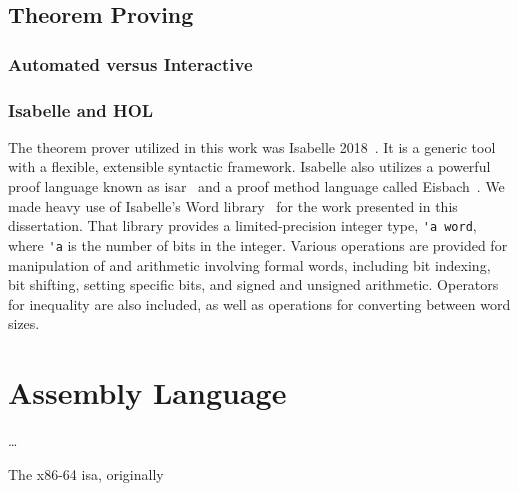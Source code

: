 
\subsection{Theorem Proving}
%

\subsubsection{Automated versus Interactive}

\subsubsection{Isabelle and HOL}
The theorem prover utilized in this work
was Isabelle 2018~\citep{nipkow2002isabelle}.%
It is a generic tool with a flexible, extensible syntactic framework.
Isabelle also utilizes a powerful proof language
known as \ac{isar}~\citep{wenzel2007isabelle}
and a proof method language called Eisbach~\citep{matichuk2016eisbach}.
We made heavy use of Isabelle's Word library~\citep{isabelle-word-session}
for the work presented in this dissertation.
That library provides a limited-precision integer type, \lstinline|'a word|,
where \lstinline|'a| is the number of bits in the integer.
Various operations are provided for manipulation of and arithmetic involving formal words,
including bit indexing, bit shifting, setting specific bits,
and signed and unsigned arithmetic.
Operators for inequality are also included,
as well as operations for converting between word sizes.




%
%

\section{Assembly Language}
\todo\dots

The x86-64
\ac{isa}, originally 

